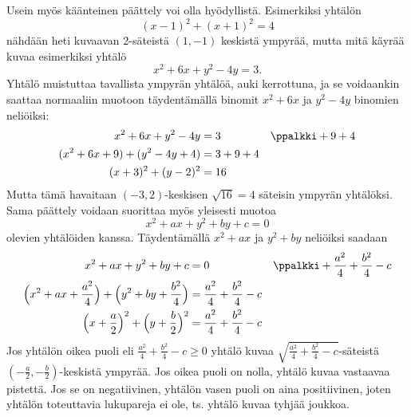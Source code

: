 Usein myös käänteinen päättely voi olla hyödyllistä. Esimerkiksi yhtälön
\[
(x-1)^2+(x+1)^2=4
\]
nähdään heti kuvaavan 2-säteistä $(1,-1)$ keskistä ympyrää, mutta mitä käyrää kuvaa esimerkiksi yhtälö
\[
x^2+6x+y^2-4y=3.
\]
Yhtälö muistuttaa tavallista ympyrän yhtälöä, auki kerrottuna, ja se voidaankin saattaa normaaliin muotoon täydentämällä binomit $x^2+6x$ ja $y^2-4y$ binomien neliöiksi:
\begin{align*}
x^2+6x+y^2-4y &= 3 && \ppalkki +9+4 \\
(x^2+6x+9)+(y^2-4y+4) &= 3+9+4 \\
(x+3)^2+(y-2)^2 &= 16
\end{align*}
Mutta tämä havaitaan $(-3,2)$-keskisen $\sqrt{16} = 4$ säteisin ympyrän yhtälöksi. Sama päättely voidaan suorittaa myös yleisesti muotoa
\[
x^2+ax+y^2+by+c = 0
\]
olevien yhtälöiden kanssa. Täydentämällä $x^2+ax$ ja $y^2+by$ neliöiksi saadaan
\begin{align*}
x^2+ax+y^2+by+c &= 0 && \ppalkki +\frac{a^2}{4}+\frac{b^2}{4}-c \\
\Big(x^2+ax+\frac{a^2}{4}\Big)+\Big(y^2+by+\frac{b^2}{4}\Big) &= \frac{a^2}{4}+\frac{b^2}{4}-c  \\
\Big(x+\frac{a}{2}\Big)^2+\Big(y+\frac{b}{2}\Big)^2 &= \frac{a^2}{4}+\frac{b^2}{4}-c
\end{align*}
Jos yhtälön oikea puoli eli $\frac{a^2}{4}+\frac{b^2}{4}-c \geq 0$ yhtälö kuvaa $\sqrt{\frac{a^2}{4}+\frac{b^2}{4}-c}$-säteistä $(-\frac{a}{2},-\frac{b}{2})$-keskistä ympyrää. Jos oikea puoli on nolla, yhtälö kuvaa vastaavaa pistettä. Jos se on negatiivinen, yhtälön vasen puoli on aina positiivinen, joten yhtälön toteuttavia lukupareja ei ole, ts. yhtälö kuvaa tyhjää joukkoa.





